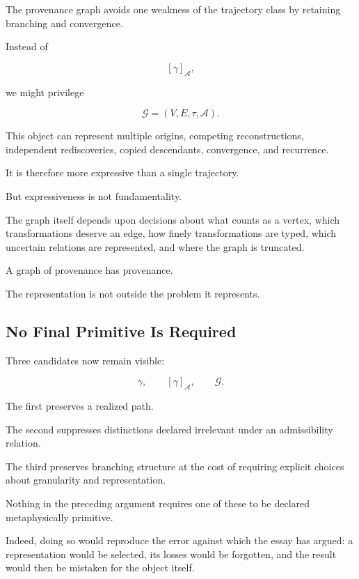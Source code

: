 \documentclass[
  11pt,
  a4paper,
  DIV=12,
  BCOR=0mm,
  parskip=half-
]{scrartcl}
\newcommand{\graphG}{\mathcal G}
\newcommand{\Adm}{\mathcal A}
\theoremstyle{definition}
\theoremstyle{plain}
\theoremstyle{remark}
\begin{document}
The provenance graph avoids one weakness of the trajectory class by retaining
branching and convergence.

Instead of

\[
  [\gamma]_{\Adm},
\]

we might privilege

\[
  \graphG=(V,E,\tau,\Adm).
\]

This object can represent multiple origins, competing reconstructions,
independent rediscoveries, copied descendants, convergence, and recurrence.

It is therefore more expressive than a single trajectory.

But expressiveness is not fundamentality.

The graph itself depends upon decisions about what counts as a vertex, which
transformations deserve an edge, how finely transformations are typed, which
uncertain relations are represented, and where the graph is truncated.

A graph of provenance has provenance.

The representation is not outside the problem it represents.


\subsection{No Final Primitive Is Required}
\label{sec:no-final-primitive}

Three candidates now remain visible:

\[
  \gamma,
  \qquad
  [\gamma]_{\Adm},
  \qquad
  \graphG.
\]

The first preserves a realized path.

The second suppresses distinctions declared irrelevant under an admissibility
relation.

The third preserves branching structure at the cost of requiring explicit
choices about granularity and representation.

Nothing in the preceding argument requires one of these to be declared
metaphysically primitive.

Indeed, doing so would reproduce the error against which the essay has argued:
a representation would be selected, its losses would be forgotten, and the
result would then be mistaken for the object itself.
\end{document}

